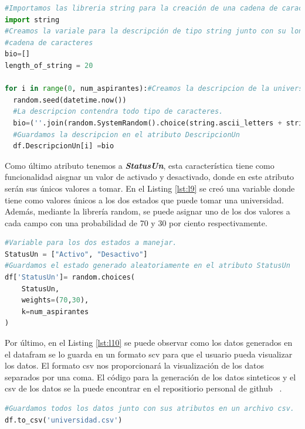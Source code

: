 \documentclass[10pt, oneside,spanish]{article}   	%
\begin{document}
\begin{lstlisting}[language=Python,label={lst:l8},caption=Atributo DescripcionUn de la entidad Universidad,frame=single, ]
#Importamos las libreria string para la creación de una cadena de caracteres que representan texto
import string
#Creamos la variale para la descripción de tipo string junto con su longitud de 
#cadena de caracteres
bio=[]
length_of_string = 20

for i in range(0, num_aspirantes):#Creamos la descripcion de la universidad
  random.seed(datetime.now())
  #La descripcion contendra todo tipo de caracteres.
  bio=(''.join(random.SystemRandom().choice(string.ascii_letters + string.digits) for i in range(length_of_string)))
  #Guardamos la descripcion en el atributo DescripcionUn
  df.DescripcionUn[i] =bio
\end{lstlisting}
Como último atributo tenemos a \textbf{\textit{StatusUn}}, esta característica tiene como funcionalidad aisgnar un valor de activado y desactivado, donde en este atributo serán sus únicos valores a tomar. En el Listing \ref{lst:l9} se creó una variable donde tiene como valores únicos a los dos estados que puede tomar una universidad. Además, mediante la librería random, se puede asignar uno de los dos valores a cada campo con una probabilidad de 70 y 30 por ciento respectivamente. 
\begin{lstlisting}[language=Python,label={lst:l9},caption=Atributo StatusUn de la entidad Universidad,frame=single, ]
#Variable para los dos estados a manejar.
StatusUn = ["Activo", "Desactivo"]
#Guardamos el estado generado aleatoriamente en el atributo StatusUn
df['StatusUn']= random.choices(
    StatusUn, 
    weights=(70,30), 
    k=num_aspirantes
)
\end{lstlisting}
Por último, en el Listing \ref{lst:l10} se puede observar como los datos generados en el datafram se lo guarda en un formato scv para que el usuario pueda visualizar los datos. El formato csv nos proporcionará la visualización de los datos separados por una coma. El código para la generación de los datos sinteticos y el csv de los datos se la puede encontrar en el repositiorio personal de github ~\cite{universidad,universidadcsv}.
\begin{lstlisting}[language=Python,label={lst:l10},caption=Exportación de los datos a un formato csv de la entidad Universidad,frame=single, ]
#Guardamos todos los datos junto con sus atributos en un archivo csv.
df.to_csv('universidad.csv')
\end{lstlisting}
\\
\end{document}

